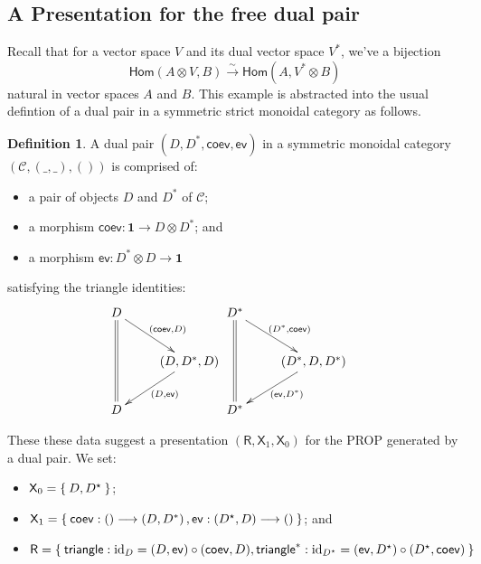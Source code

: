 \documentclass[pra,floatfix,
amsmath,superscriptaddress, 12pt]{article}
\theoremstyle{definition}
\newtheorem{defn}[thm]{Definition}
\newcommand{\liso}{\overset{\sim}{\longrightarrow}}
\newcommand{\evmap}{\mathsf{ev}}
\newcommand{\coev}{\mathsf{coev}}
\newcommand{\msf}[1]{\mathsf{#1}}
\DeclareMathOperator{\id}{{\normalfont\text{id}}}
\begin{document}
\subsection{A Presentation for the free dual pair}
Recall that for a vector space $V$ and its dual vector space $V^{*}$,
we've a bijection 
\[
\mathsf{Hom}\left(A\otimes V,B\right)\liso\mathsf{Hom}\left(A,V^{*}\otimes B\right)
\]
 natural in vector spaces $A$ and $B$. This example is abstracted
into the usual defintion of a dual pair in a symmetric strict monoidal
category as follows.
\begin{defn}
A dual pair $\left(D,D^{*},\coev,\evmap\right)$ in a symmetric monoidal
category $\left(\mathcal{C},\left(\_,\_\right),\left(\right)\right)$
is comprised of:
\begin{itemize}
\item a pair of objects $D$ and $D^{*}$ of $\mathcal{C}$;
\item a morphism $\coev:\mathbf{1}\longrightarrow D\otimes D^{*}$; and
\item a morphism $\evmap:D^{*}\otimes D\longrightarrow\mathbf{1}$
\end{itemize}
satisfying the triangle identities:
\[
\begin{split}\vcenter{\vbox{\xymatrix{D\ar@{=}[dd]\ar[dr]^{\left(\coev,D\right)}\\
 & \left(D,D^{*},D\right)\ar[dl]^{\left(D,\evmap\right)}\\
D
}
}} & \vcenter{\vbox{\xymatrix{D^{*}\ar@{=}[dd]\ar[dr]^{\left(D^{*},\coev\right)}\\
 & \left(D^{*},D,D^{*}\right)\ar[dl]^{\left(\evmap,D^{*}\right)}\\
D^{*}
}
}}\end{split}
\]
\end{defn}

These these data suggest a presentation $(\msf{R},\msf{X}_1,\msf{X}_0)$ for the \textsf{PROP}
generated by a dual pair. We set:

\begin{itemize}
    \item $\msf{X}_0 = \Set{D,D^\star}$;
    \item $\msf{X}_1 = \Set{
        \coev:\left(\right) \longrightarrow \left(D,D^{*}\right),
        \evmap:\left(D^{\star},D\right)\longrightarrow \left(\right)
    }$; and
    \item $\msf{R} =
    \Set{
        \mathsf{triangle}:\id_{D}=(D,\evmap)\circ (\coev,D),
        \mathsf{triangle}^{*}:\id_{D^\star}= (\evmap,D^\star)\circ(D^\star,\coev)
    }$
\end{itemize}
\end{document}
